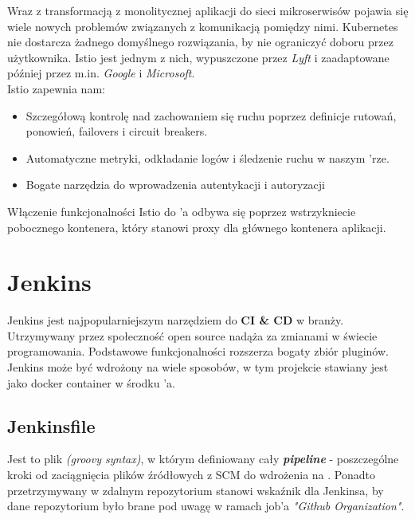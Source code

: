 Wraz z transformacją z monolitycznej aplikacji do sieci mikroserwisów pojawia się wiele nowych problemów związanych z komunikacją pomiędzy nimi.
Kubernetes nie dostarcza żadnego domyślnego rozwiązania, by nie ograniczyć doboru przez użytkownika.
Istio jest jednym z nich, wypuszczone przez \emph{Lyft} i zaadaptowane później przez m.in. \emph{Google} i \emph{Microsoft}. ~\cite{istio-what}\\
Istio zapewnia nam:

\begin{itemize}
    \item
    Szczegółową kontrolę nad zachowaniem się ruchu poprzez definicje rutowań, ponowień, failovers i circuit breakers.
    
    \item
    Automatyczne metryki, odkładanie logów i śledzenie ruchu w naszym 'rze.

    \item
    Bogate narzędzia do wprowadzenia autentykacji i autoryzacji
    
\end{itemize} 

Włączenie funkcjonalności Istio do 'a odbywa się poprzez wstrzykniecie pobocznego kontenera, 
który stanowi proxy dla głównego kontenera aplikacji.

\section{Jenkins}

Jenkins jest najpopularniejszym narzędziem do \textbf{CI \& CD} w branży. 
Utrzymywany przez społeczność open source nadąża za zmianami w świecie programowania.
Podstawowe funkcjonalności rozszerza bogaty zbiór pluginów.
Jenkins może być wdrożony na wiele sposobów, w tym projekcie stawiany jest jako docker container w środku 'a. 

\subsection{Jenkinsfile}
Jest to plik \emph{(groovy syntax)}, w którym definiowany cały \textbf{\emph{pipeline}} - poszczególne kroki od zaciągnięcia plików źródłowych z SCM do wdrożenia na .
Ponadto przetrzymywany w zdalnym repozytorium stanowi wskaźnik dla Jenkinsa, by dane repozytorium było brane pod uwagę w ramach job'a \emph{"Github Organization"}.

